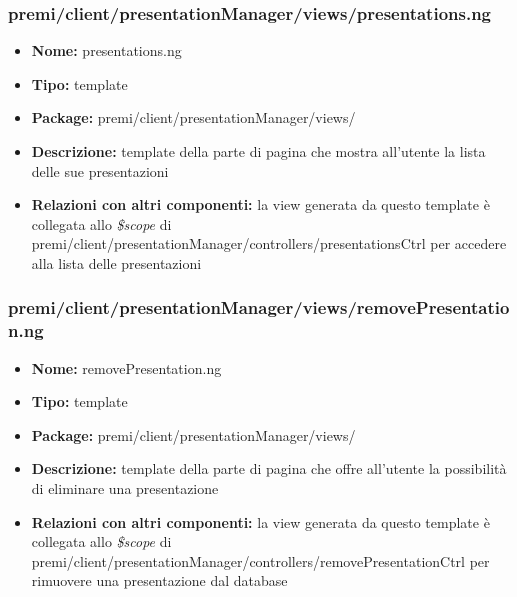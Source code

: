 \subsubsection{premi/client/presentationManager/views/presentations.ng}
\begin{itemize}
  \item[] \textbf{Nome:} presentations.ng
  \item[] \textbf{Tipo:} template
  \item[] \textbf{Package:} premi/client/presentationManager/views/
  \item[] \textbf{Descrizione:} template della parte di pagina che mostra all'utente la lista delle sue presentazioni
  \item[] \textbf{Relazioni con altri componenti:} la view generata da questo template è collegata allo \textit{\$scope} di premi/client/presentationManager/controllers/presentationsCtrl per accedere alla lista delle presentazioni
\end{itemize}

\subsubsection{premi/client/presentationManager/views/removePresentation.ng}
\begin{itemize}
  \item[] \textbf{Nome:} removePresentation.ng
  \item[] \textbf{Tipo:} template 
  \item[] \textbf{Package:} premi/client/presentationManager/views/
  \item[] \textbf{Descrizione:} template della parte di pagina che offre all'utente la possibilità di eliminare una presentazione 
  \item[] \textbf{Relazioni con altri componenti:} la view generata da questo template è collegata allo \textit{\$scope} di premi/client/presentationManager/controllers/removePresentationCtrl per rimuovere una presentazione dal database
\end{itemize}

